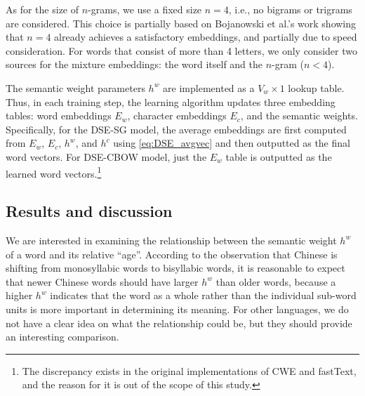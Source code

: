 \documentclass[output=paper]{langsci/langscibook}
\begin{document}
As for the size of $n$-grams, we use a fixed size $n=4$, i.e., no bigrams or trigrams are considered. This choice is partially based on Bojanowski et al.'s \citeyearpar{bojanowski2017enriching} work showing that $n=4$ already achieves a satisfactory embeddings, and partially due to speed consideration. 
For words that consist of more than 4 letters, we only consider two sources for the mixture embeddings: the word itself and the $n$-gram ($n<4$).

The semantic weight parameters $h^w$ are implemented as a $V_w\times 1$ lookup table. Thus, in each training step, the learning algorithm updates three embedding tables: word embeddings $E_w$, character embeddings $E_c$, and the semantic weights. 
Specifically, for the DSE-SG model, the average embeddings are first computed from $E_w$, $E_c$, $h^w$, and $h^c$ using \cref{eq:DSE_avgvec} and then outputted as the final word vectors. For DSE-CBOW model, just the $E_w$ table is outputted as the learned word vectors.\footnote{The discrepancy exists in the original implementations of CWE and fastText, and the reason for it is out of the scope of this study.}


\subsection{Results and discussion}
We are interested in examining the relationship between the semantic weight $h^w$ of a word and its relative ``age''. 
According to the observation that Chinese is shifting from monosyllabic words to bisyllabic words, it is reasonable to expect that newer Chinese words should have larger $h^w$ than older words, because a higher $h^w$ indicates that the word as a whole rather than the individual sub-word units is more important in determining its meaning. 
For other languages, we do not have a clear idea on what the relationship could be, but they should provide an interesting comparison. 
\end{document}
